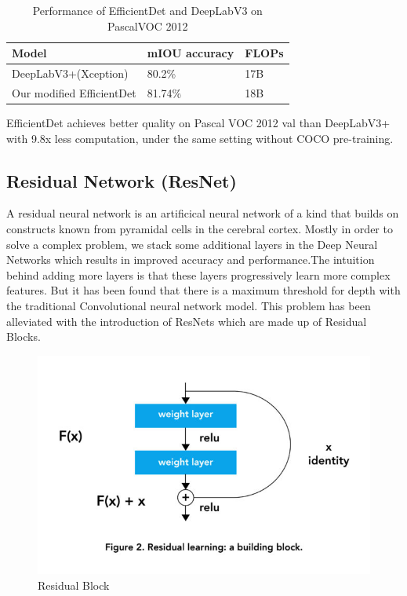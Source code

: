 \documentclass[12pt]{report}
\begin{document}
\begin{table}[H]
\caption{Performance of EfficientDet and DeepLabV3 on PascalVOC 2012\cite{Efficientdet}} %
\centering %
    \begin{tabular}{| l | l | l |}
	 \hline\hline
    Model & mIOU accuracy & FLOPs \\ \hline
    DeepLabV3+(Xception) &  80.2\%&17B \\ \hline
   Our modified EfficientDet &  81.74\%&18B \\ \hline
   
      		
\end{tabular}
\end{table}
EfficientDet achieves better quality on Pascal VOC 2012 val than DeepLabV3+ with 9.8x less computation, under the same setting without COCO pre-training.

\subsection{Residual Network (ResNet)}
A residual neural network is an artificical neural network of a kind that builds on constructs known from pyramidal cells in the cerebral cortex\cite{Residual}. 
Mostly in order to solve a complex problem, we stack some additional layers in the Deep Neural Networks which results in improved accuracy and performance.The intuition behind adding more layers is that these layers progressively learn more complex features. But it has been found that there is a maximum threshold for depth with the traditional Convolutional neural network model. This problem has been alleviated with the introduction of ResNets which are made up of Residual Blocks.

\begin{figure}[H]\includegraphics[scale=2]{resnet.jpg}\centering\caption{Residual Block \cite{Res}} \label{fig:Residual Block} \end{figure}%
\end{document}
